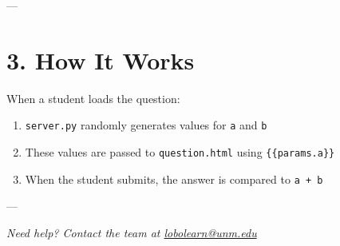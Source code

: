 \documentclass[12pt]{article}
\begin{document}
---

\section*{3. How It Works}
When a student loads the question:
\begin{enumerate}
    \item \texttt{server.py} randomly generates values for \texttt{a} and \texttt{b}
    \item These values are passed to \texttt{question.html} using \texttt{{\{\{params.a\}\}}}
    \item When the student submits, the answer is compared to \texttt{a + b}
\end{enumerate}

---


\vfill
\begin{center}
    \textit{Need help? Contact the team at \href{mailto:lobolearn@unm.edu}{lobolearn@unm.edu}}\\[0.5em]
\end{center}
\end{document}
